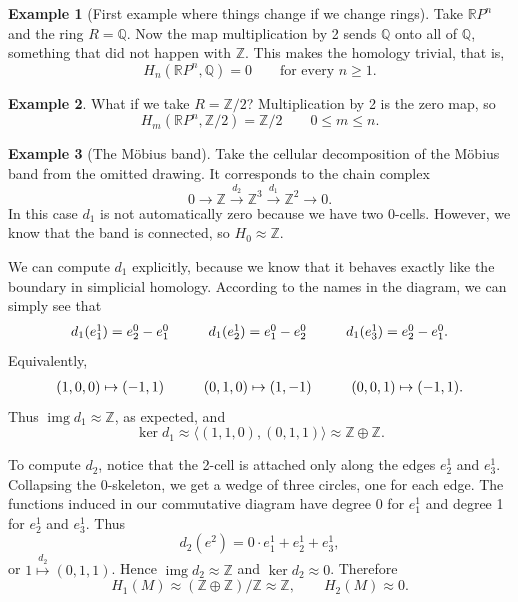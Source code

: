 \documentclass{book}
\theoremstyle{definition}
\newtheorem*{ejem}{Example}
\newcommand{\R}{\mathbb{R}}
\newcommand{\Z}{\mathbb{Z}}
\newcommand{\Q}{\mathbb{Q}}
\DeclareMathOperator{\img}{img}
\begin{document}
\begin{ejem}[First example where things change if we change
rings]
Take $\R P^n$ and the ring $R=\Q$. Now the map
multiplication by 2 sends $\Q$ onto all of $\Q$, something
that did not happen with $\Z$. This makes the homology
trivial, that is,
$$
H_n(\R P^n,\Q)=0
\qquad\text{for every } n\geq1.
$$
\end{ejem}

\begin{ejem}
What if we take $R=\Z/2$? Multiplication by 2 is the zero map,
so
$$
H_m(\R P^n,\Z/2)=\Z/2
\qquad 0\leq m\leq n.
$$
\end{ejem}

\begin{ejem}[The M\"obius band]
Take the cellular decomposition of the M\"obius band from the
omitted drawing. It corresponds to the chain complex
$$
0\to\Z\xrightarrow{d_2}\Z^3\xrightarrow{d_1}\Z^2\to0.
$$
In this case $d_1$ is not automatically zero because we have
two 0-cells. However, we know that the band is connected, so
$H_0\approx\Z$.

We can compute $d_1$ explicitly, because we know that it
behaves exactly like the boundary in simplicial homology.
According to the names in the diagram, we can simply see that
$$
\begin{array}{c@{\hspace{1cm}}c@{\hspace{1cm}}c}
d_1(e^1_1)=e^0_2-e^0_1&
 d_1(e^1_2)=e^0_1-e^0_2&
 d_1(e^1_3)=e^0_2-e^0_1.
\end{array}
$$
Equivalently,
$$
\begin{array}{c@{\hspace{1cm}}c@{\hspace{1cm}}c}
(1,0,0)\mapsto(-1,1)&
(0,1,0)\mapsto(1,-1)&
(0,0,1)\mapsto(-1,1).
\end{array}
$$
Thus $\img d_1\approx\Z$, as expected, and
$$
\ker d_1\approx\langle(1,1,0),(0,1,1)\rangle
\approx\Z\oplus\Z.
$$

To compute $d_2$, notice that the 2-cell is attached only
along the edges $e^1_2$ and $e^1_3$. Collapsing the
0-skeleton, we get a wedge of three circles, one for each
edge. The functions induced in our commutative diagram have
degree 0 for $e^1_1$ and degree 1 for $e^1_2$ and $e^1_3$.
Thus
$$
d_2(e^2)=0\cdot e^1_1+e^1_2+e^1_3,
$$
or $1\overset{d_2}{\mapsto}(0,1,1)$. Hence
$\img d_2\approx\Z$ and $\ker d_2\approx0$. Therefore
$$
H_1(M)\approx(\Z\oplus\Z)/\Z\approx\Z,
\qquad
H_2(M)\approx0.
$$
\end{ejem}
\end{document}
